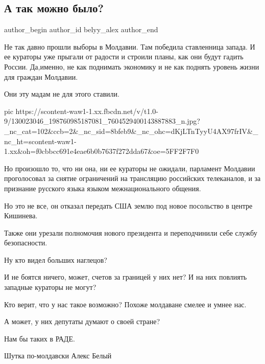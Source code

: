  
 
 
 
 

\subsection{А так можно было?}

\ifcmt
  author_begin
   author_id belyy_alex
  author_end
\fi

Не так давно прошли выборы в Молдавии. Там победила ставленница запада. И ее
кураторы уже прыгали от радости и строили планы, как они будут гадить России.
Да,именно, не как поднимать экономику и не как поднять уровень жизни для
граждан Молдавии. 

Они эту мадам не для этого ставили.  

\ifcmt
pic https://scontent-waw1-1.xx.fbcdn.net/v/t1.0-9/130023046_198760985187081_7604529400143887883_n.jpg?_nc_cat=102&ccb=2&_nc_sid=8bfeb9&_nc_ohc=dKjLTnTyyU4AX97frIV&_nc_ht=scontent-waw1-1.xx&oh=f0cbbcc691e4eae6b0b7637f272dda67&oe=5FF2F7F0
\fi

Но произошло то, что ни она, ни ее кураторы не ожидали, парламент Молдавии
проголосовал за снятие ограничений на трансляцию российских телеканалов, и за
признание русского языка языком межнационального  общения. 

Но это не все, он отказал передать США землю   под новое посольство в центре
Кишинева.

Также они урезали полномочия нового президента и переподчинили себе службу
безопасности. 

Ну кто видел больших наглецов? 

И не боятся ничего, может, счетов за границей у них нет? И на них повлиять
западные кураторы не могут?

Кто верит, что у нас такое возможно? Похоже молдаване смелее и умнее нас.

А может, у них депутаты думают о своей стране? 

Нам бы таких в РАДЕ.     

Шутка по-молдавски Алекс Белый
